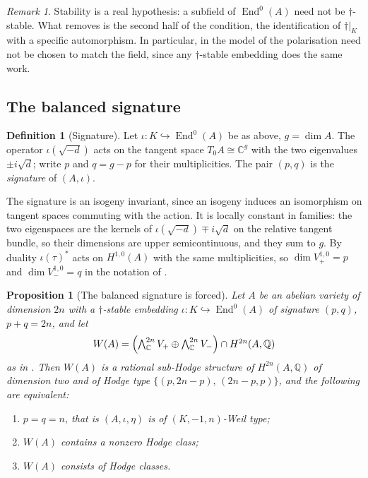 \documentclass[11pt,reqno]{amsart}
\theoremstyle{plain}
\newtheorem{proposition}[theorem]{Proposition}
\theoremstyle{definition}
\newtheorem{definition}[theorem]{Definition}
\theoremstyle{remark}
\newtheorem{remark}[theorem]{Remark}
\newcommand{\QQ}{\mathbb{Q}}
\newcommand{\CC}{\mathbb{C}}
\newcommand{\HW}{W}                      %
\DeclareMathOperator{\End}{End}
\begin{document}
\begin{remark}\label{rem:whystable}
Stability is a real hypothesis: a subfield of $\End^{0}(A)$ need not be
$\dagger$-stable. What  removes is the second half of the
condition, the identification of $\dagger|_{K}$ with a specific automorphism.
In particular, in the model of  the polarisation need not be
chosen to match the field, since any $\dagger$-stable embedding does the same
work.
\end{remark}

\subsection{The balanced signature}

\begin{definition}[Signature]\label{def:signature}
Let $\iota\colon K\hookrightarrow\End^{0}(A)$ be as above, $g=\dim A$. The
operator $\iota(\sqrt{-d})$ acts on the tangent space $T_{0}A\cong\CC^{g}$ with
the two eigenvalues $\pm i\sqrt{d}$; write $p$ and $q=g-p$ for their
multiplicities. The pair $(p,q)$ is the \emph{signature} of $(A,\iota)$.
\end{definition}

The signature is an isogeny invariant, since an isogeny induces an isomorphism
on tangent spaces commuting with the action. It is locally constant in
families: the two eigenspaces are the kernels of
$\iota(\sqrt{-d})\mp i\sqrt{d}$ on the relative tangent bundle, so their
dimensions are upper semicontinuous, and they sum to $g$. By
duality $\iota(\tau)^{*}$ acts on $H^{1,0}(A)$ with the same multiplicities, so
$\dim V^{1,0}_{+}=p$ and $\dim V^{1,0}_{-}=q$ in the notation of
.

\begin{proposition}[The balanced signature is forced]\label{prop:signatureforced}
Let $A$ be an abelian variety of dimension $2n$ with a $\dagger$-stable
embedding $\iota\colon K\hookrightarrow\End^{0}(A)$ of signature $(p,q)$,
$p+q=2n$, and let
\[
  \HW(A)=\Bigl(\textstyle\bigwedge^{2n}_{\CC}V_{+}
   \oplus\bigwedge^{2n}_{\CC}V_{-}\Bigr)\cap H^{2n}(A,\QQ)
\]
as in . Then $\HW(A)$ is a rational sub-Hodge structure of
$H^{2n}(A,\QQ)$ of dimension two and of Hodge type
$\{(p,2n-p),\,(2n-p,p)\}$, and the following are equivalent:
\begin{enumerate}[label=\textup{(\roman*)},nosep]
\item $p=q=n$, that is $(A,\iota,\eta)$ is of $(K,-1,n)$-Weil type;
\item $\HW(A)$ contains a nonzero Hodge class;
\item $\HW(A)$ consists of Hodge classes.
\end{enumerate}
\end{proposition}
\end{document}
